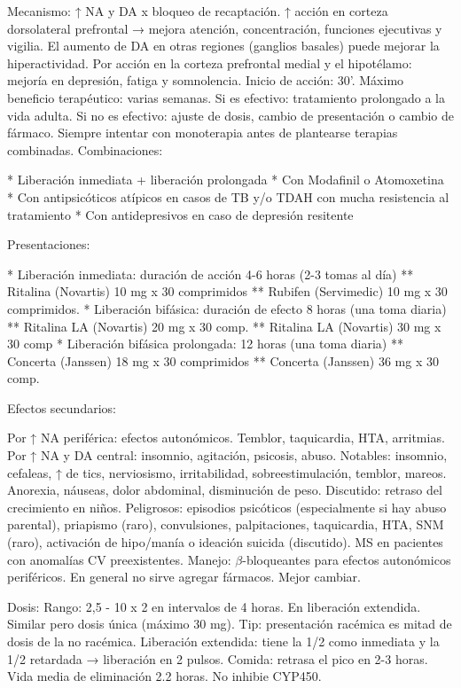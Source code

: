 Mecanismo: ↑ NA y DA x bloqueo de recaptación. ↑ acción en corteza dorsolateral prefrontal → mejora atención, concentración, funciones ejecutivas y vigilia. El aumento de DA en otras regiones (ganglios basales) puede mejorar la hiperactividad. Por acción en la corteza prefrontal medial y el hipotélamo: mejoría en depresión, fatiga y somnolencia.
Inicio de acción: 30'. Máximo beneficio terapéutico: varias semanas.
Si es efectivo: tratamiento prolongado a la vida adulta.
Si no es efectivo: ajuste de dosis, cambio de presentación o cambio de fármaco.
Siempre intentar con monoterapia antes de plantearse terapias combinadas.
Combinaciones:

* Liberación inmediata + liberación prolongada
* Con Modafinil o Atomoxetina
* Con antipsicóticos atípicos en casos de TB y/o TDAH con mucha resistencia al tratamiento
* Con antidepresivos en caso de depresión resitente

Presentaciones:

* Liberación inmediata: duración de acción 4-6 horas (2-3 tomas al día)
** Ritalina (Novartis) 10 mg x 30 comprimidos
** Rubifen (Servimedic) 10 mg x 30 comprimidos.
* Liberación bifásica: duración de efecto 8 horas (una toma diaria)
** Ritalina LA (Novartis) 20  mg x 30 comp.
** Ritalina LA (Novartis) 30 mg x 30 comp
* Liberación bifásica  prolongada: 12 horas (una toma diaria)
** Concerta (Janssen) 18 mg x 30 comprimidos
** Concerta (Janssen) 36 mg x 30 comp.

Efectos secundarios:

Por ↑ NA periférica: efectos autonómicos. Temblor, taquicardia, HTA, arritmias.
Por ↑ NA y DA central: insomnio, agitación, psicosis, abuso.
Notables: insomnio, cefaleas, ↑ de tics, nerviosismo, irritabilidad, sobreestimulación, temblor, mareos. Anorexia, náuseas, dolor abdominal, disminución de peso. Discutido: retraso del crecimiento en niños.
Peligrosos: episodios psicóticos (especialmente si hay abuso parental), priapismo (raro), convulsiones, palpitaciones, taquicardia, HTA, SNM (raro), activación de hipo/manía o ideación suicida (discutido). MS en pacientes con anomalías CV preexistentes.
Manejo: $\beta$-bloqueantes para efectos autonómicos periféricos. En general no sirve agregar fármacos. Mejor cambiar.

Dosis:
Rango: 2,5 - 10 x 2 en intervalos de 4 horas. En liberación extendida. Similar pero dosis única (máximo 30 mg).
Tip: presentación racémica es mitad de dosis de la no racémica. Liberación extendida: tiene la 1/2 como inmediata y la 1/2 retardada → liberación en 2 pulsos. Comida: retrasa el pico en 2-3 horas. Vida media de eliminación 2.2 horas. No inhibie CYP450.

